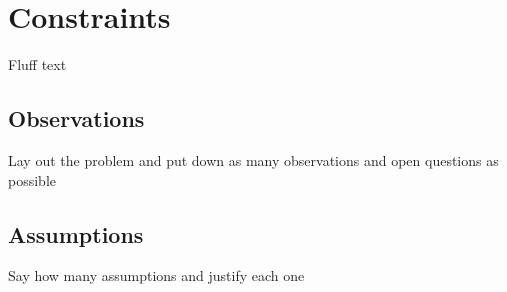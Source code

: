 \section{Constraints}

\FIXME Fluff text

\subsection{Observations}

\FIXME Lay out the problem and put down as many observations and open questions
as possible

\subsection{Assumptions}

\FIXME Say how many assumptions and justify each one
